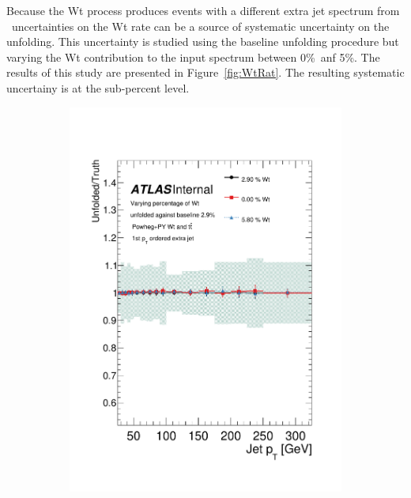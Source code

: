 
Because the Wt process produces events with a different extra jet spectrum from
\ttbar\, uncertainties on the Wt rate can be a source of systematic uncertainty
on the unfolding.  This uncertainty is studied using the baseline unfolding procedure
but varying the Wt contribution to the input spectrum between 0\%\ anf 5\%.
The results of this study are presented in Figure~\ref{fig:WtRat}.  The
resulting systematic uncertainy is at the sub-percent level.

\begin{figure}
\centering
\begin{subfigure}[]{0.3\textwidth}
\includegraphics[width=\textwidth]{fig/Wt/TruthRatioJet0.pdf}
\end{subfigure}
~
\begin{subfigure}[]{0.3\textwidth}

\end{subfigure}
\end{figure}
